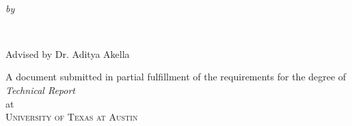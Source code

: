 \begin{titlepage}
  \vspace*{5cm}
  \makeatletter
  \begin{center}
    \begin{Huge}
      \@title
    \end{Huge}\\
    \begin{Large}
      \@subtitle
    \end{Large}
    \emph{by}\\
    \begin{Large}
        \@author\\
    \end{Large}
    \begin{Large}
        \vspace{5mm}
        Advised by Dr. Aditya Akella
    \end{Large}
    \vfill
    A document submitted in partial fulfillment
    of the requirements for the degree of\\
    \emph{Technical Report}\\
    at\\
    \textsc{University of Texas at Austin}
  \end{center}
  \makeatother
\end{titlepage}

\newpage
\null
\thispagestyle{empty}
\newpage
